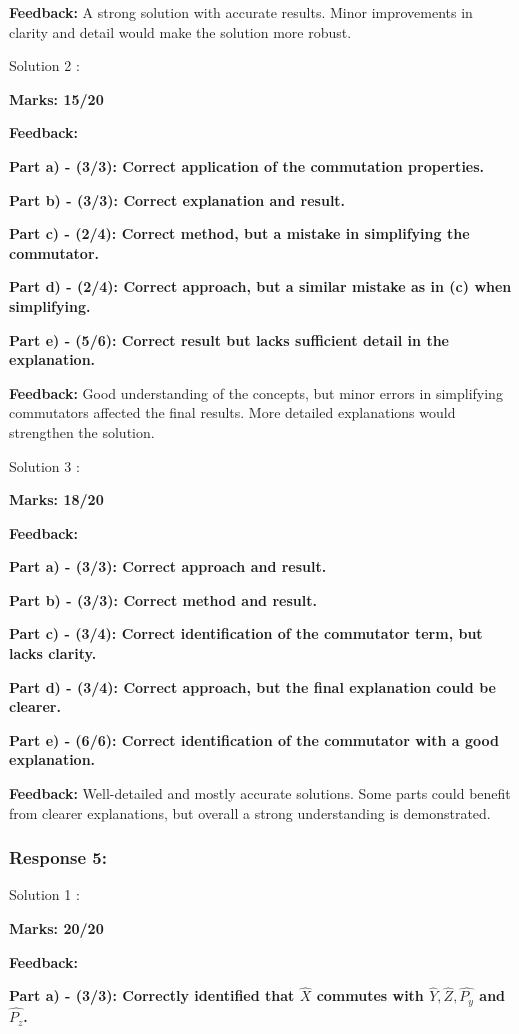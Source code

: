 \documentclass[a4paper,11pt]{article}
\begin{document}
\textbf{Feedback:}
A strong solution with accurate results. Minor improvements in clarity and detail would make the solution more robust.


Solution 2 :

\textbf{Marks: 15/20}

\textbf{Feedback:}

\textbf{Part a) - (3/3):  Correct application of the commutation properties.}

\textbf{Part b) -  (3/3): Correct explanation and result.}

\textbf{Part c) - (2/4): Correct method, but a mistake in simplifying the commutator.}

\textbf{Part d) - (2/4): Correct approach, but a similar mistake as in (c) when simplifying.}

\textbf{Part e) - (5/6): Correct result but lacks sufficient detail in the explanation.}


\textbf{Feedback:}
Good understanding of the concepts, but minor errors in simplifying commutators affected the final results. More detailed explanations would strengthen the solution.


Solution 3 :

\textbf{Marks: 18/20}

\textbf{Feedback:}

\textbf{Part a) - (3/3): Correct approach and result.}

\textbf{Part b) - (3/3): Correct method and result.}

\textbf{Part c) - (3/4): Correct identification of the commutator term, but lacks clarity.}

\textbf{Part d) - (3/4): Correct approach, but the final explanation could be clearer.}

\textbf{Part e) - (6/6): Correct identification of the commutator with a good explanation.}


\textbf{Feedback:}
Well-detailed and mostly accurate solutions. Some parts could benefit from clearer explanations, but overall a strong understanding is demonstrated.


\subsubsection*{Response 5:}

Solution 1 :

\textbf{Marks: 20/20}

\textbf{Feedback:}

\textbf{Part a) - (3/3):  Correctly identified that $\hat{X}$ commutes with $\hat{Y},\hat{Z}, \hat{P_y}$ and $\hat{P_z}$.}
\end{document}
